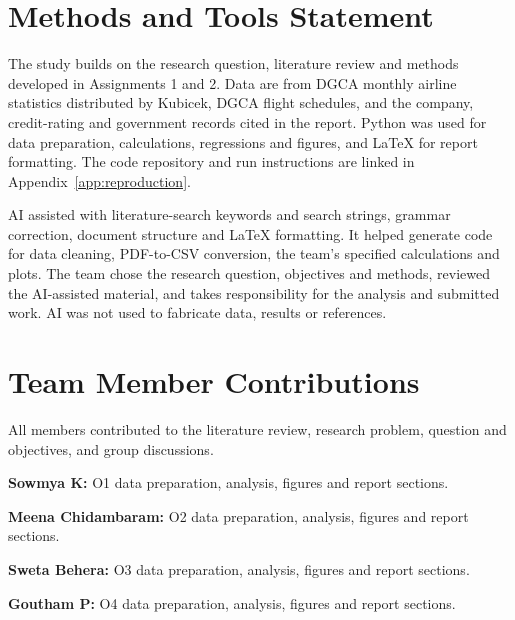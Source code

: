 \documentclass[12pt,a4paper]{article}
\newcommand{\templatebullet}[1]{\par\noindent\textbullet\hspace{5.88pt}#1\par}
\begin{document}
\begingroup
{}
\setlength{\parskip}{4pt}
\titlespacing*{\section}{0pt}{12pt}{6pt}
\section*{Methods and Tools Statement}
The study builds on the research question, literature review and methods developed in Assignments 1 and 2. Data are from DGCA monthly airline statistics distributed by Kubicek, DGCA flight schedules, and the company, credit-rating and government records cited in the report. Python was used for data preparation, calculations, regressions and figures, and LaTeX for report formatting. The code repository and run instructions are linked in Appendix~\ref{app:reproduction}.

AI assisted with literature-search keywords and search strings, grammar correction, document structure and LaTeX formatting. It helped generate code for data cleaning, PDF-to-CSV conversion, the team's specified calculations and plots. The team chose the research question, objectives and methods, reviewed the AI-assisted material, and takes responsibility for the analysis and submitted work. AI was not used to fabricate data, results or references.

\section*{Team Member Contributions}
All members contributed to the literature review, research problem, question and objectives, and group discussions.
\templatebullet{\textbf{Sowmya K:} O1 data preparation, analysis, figures and report sections.}
\templatebullet{\textbf{Meena Chidambaram:} O2 data preparation, analysis, figures and report sections.}
\templatebullet{\textbf{Sweta Behera:} O3 data preparation, analysis, figures and report sections.}
\templatebullet{\textbf{Goutham P:} O4 data preparation, analysis, figures and report sections.}

\endgroup
\end{document}
